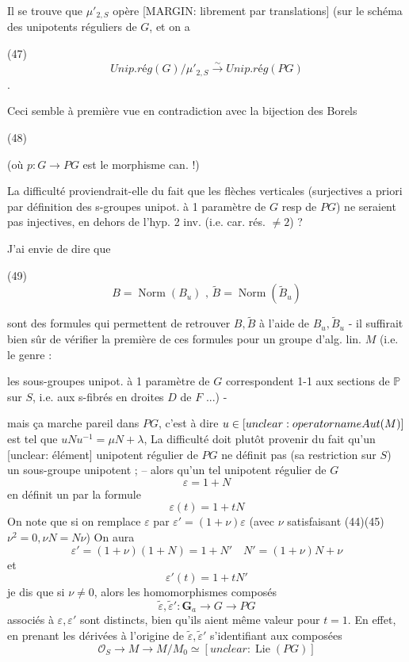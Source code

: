 \begin{enumerate}
\newpage


Il se trouve que $\mu'_{2, S}$ opère [MARGIN: librement par translations] (sur le schéma des unipotents réguliers de $G$, et on a

(47) $$ Unip.rég(G)/\mu'_{2, S} \xrightarrow{\sim} Unip.rég(PG) $$ .

Ceci semble à première vue en contradiction avec la bijection des Borels

(48)

(où $p : G \to PG$ est le morphisme can. !)

La difficulté proviendrait-elle du fait que les flèches verticales (surjectives a priori par définition des s-groupes unipot. à 1 paramètre de $G$ resp de $PG$) ne seraient pas injectives, en dehors de l'hyp. 2 inv. (i.e. car. rés. $\neq 2$) ?

J'ai envie de dire que

(49) $$ B = \operatorname{Norm}(B_u) \text{ , } \tilde{B} = \operatorname{Norm}(\tilde{B}_u) $$

sont des formules qui permettent de retrouver $B, \tilde{B}$ à l'aide de $B_u, \tilde{B}_u$ - il suffirait bien sûr de vérifier la première de ces formules pour un groupe d'alg. lin. $M$ (i.e. le genre :

les sous-groupes unipot. à 1 paramètre de $G$ correspondent 1-1 aux sections de $\mathbb{P}$ sur $S$, i.e. aux s-fibrés en droites $D$ de $F$ ...) -

\newpage


mais ça marche pareil dans $PG$, c'est à
dire $u \in [unclear: \\operatorname{Aut}(M)]$ est tel que $u N u^{-1} = \mu N + \lambda$,
La difficulté doit plutôt provenir du
fait qu'un [unclear: élément] unipotent régulier
de $PG$ ne définit pas (sa restriction
sur $S$) un sous-groupe unipotent ;
-- alors qu'un tel unipotent régulier de $G$
$$ \varepsilon = 1 + N $$
en définit un par la formule
$$ \varepsilon(t) = 1 + t N $$
On note que si on remplace $\varepsilon$ par $\varepsilon' = (1+\nu)\varepsilon$
(avec $\nu$ satisfaisant (44)(45) $\nu^2=0, \nu N = N \nu$)
On aura
$$ \varepsilon' = (1+\nu)(1+N) = 1 + N' \quad N' = (1+\nu)N + \nu $$
et
$$ \varepsilon'(t) = 1 + t N' $$
je dis que si $\nu \neq 0$, alors les
homomorphismes composés
$$ \tilde{\varepsilon}, \tilde{\varepsilon}' : \mathbf{G}_a \to G \to PG $$
associés à $\varepsilon, \varepsilon'$ sont distincts,
bien qu'ils aient même valeur pour $t=1$.
En effet, en prenant les dérivées à l'origine
de $\tilde{\varepsilon}, \tilde{\varepsilon}'$ s'identifiant aux composées
$$ \mathcal{O}_S \to M \to M/M_0 \simeq [unclear: \operatorname{Lie}(PG)] $$


\end{enumerate}
